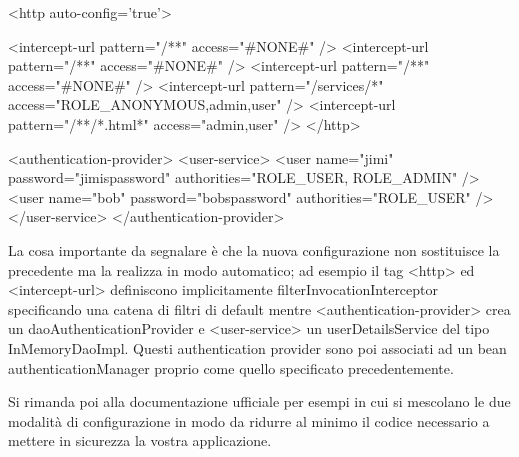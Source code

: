 \begin{xml}
<http auto-config='true'>

<intercept-url pattern="/**" access="#NONE#" />
<intercept-url pattern="/**" access="#NONE#" />
<intercept-url pattern="/**" access="#NONE#" />
<intercept-url pattern="/services/*" access="ROLE_ANONYMOUS,admin,user" />
<intercept-url pattern="/**/*.html*" access="admin,user" />
</http>

<authentication-provider>
   <user-service>
    <user name="jimi" password="jimispassword" authorities="ROLE_USER, ROLE_ADMIN" />
    <user name="bob" password="bobspassword" authorities="ROLE_USER" />
   </user-service>
</authentication-provider>
\end{xml}

La cosa importante da segnalare è che la nuova configurazione non sostituisce la precedente ma la realizza in modo automatico; ad esempio il tag <http> ed <intercept-url> definiscono implicitamente  filterInvocationInterceptor specificando una catena di filtri di default  mentre <authentication-provider> crea un daoAuthenticationProvider e <user-service> un  userDetailsService del tipo InMemoryDaoImpl. Questi authentication provider sono poi associati ad un bean authenticationManager proprio come quello specificato precedentemente.

Si rimanda poi alla documentazione ufficiale per esempi in cui si mescolano le due modalità di configurazione in modo da ridurre al minimo il codice necessario a mettere in sicurezza la vostra applicazione.
